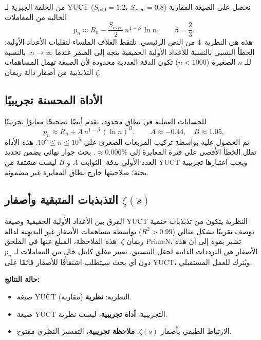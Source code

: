 \documentclass[11pt,a4paper]{article}
\begin{document}
	من الحلقة الجبرية لـ YUCT (\(S_{\mathrm{odd}}=1.2\)، \(S_{\mathrm{even}}=0.8\)) نحصل على الصيغة المقاربة الخالية من المعاملات
	\[
	\boxed{p_n \approx R_n - \frac{S_{\mathrm{even}}}{2}\, n^{1-\beta}\,\ln n},
	\qquad \beta = \frac{2}{3}.
	\]
	هذه هي النظرية~4 من النص الرئيسي. تلتقط الغلاف الملساء لتقلبات الأعداد الأولية: الخطأ النسبي بالنسبة للأعداد الأولية الحقيقية يتجه إلى الصفر عندما \(n\to\infty\). بالنسبة للـ \(n\) الصغيرة (\(n < 1000\)) تكون الدقة العددية محدودة لأن الصيغة تهمل المساهمات التذبذبية من أصفار دالة ريمان \(\zeta\).
	
	\subsection{الأداة المحسنة تجريبيًا}
	
	للحسابات العملية في نطاق محدود، نقدم أيضًا تصحيحًا معايرًا تجريبيًا
	\[
	p_n \approx R_n + A\, n^{1-\beta}\,(\ln n)^B,
	\qquad A \approx -0.44,\quad B \approx 1.05,
	\]
	تم الحصول عليه بواسطة تركيب المربعات الصغرى على \(10^3\le n\le 10^5\). هذه الأداة تقلل الخطأ الأقصى على فترة المعايرة إلى \(\approx 0.006\%\). بحث جوار نهائي يضمن تحديد العدد الأولي بدقة. الثوابت \(A\) و \(B\) ليست مشتقة من YUCT ويجب اعتبارها تجريبية بحتة؛ صلاحيتها خارج نطاق المعايرة غير مضمونة.
	
	\subsection{التذبذبات المتبقية وأصفار \(\zeta(s)\)}
	
	الفرق بين الأعداد الأولية الحقيقية وصيغة YUCT النظرية يتكون من تذبذبات حتمية توصف تقريبًا بشكل مثالي (\(R^2>0.99\)) بواسطة مساهمات الأصفار غير البديهية لدالة ريمان \(\zeta\). هذه الملاحظة، المبلغ عنها في الملحق PrimeN، تشير بقوة إلى أن هذه الأصفار هي الترددات الذاتية لحقل التنسيق. تعبير مغلق كامل خالٍ من المعاملات لـ \(p_n\) دون أي بحث سيتطلب اشتقاقًا للأصفار قائمًا على YUCT، ويُترك للعمل المستقبلي.
	
	\textbf{حالة النتائج:}
	\begin{itemize}
		\item صيغة YUCT النظرية: \textbf{نظرية} (مقاربة).
		\item صيغة YUCT التجريبية: \textbf{أداة تجريبية}، ليست نظرية.
		\item الارتباط الطيفي بأصفار \(\zeta(s)\): \textbf{ملاحظة تجريبية}، التفسير النظري مفتوح.
	\end{itemize}
	
\end{document}
